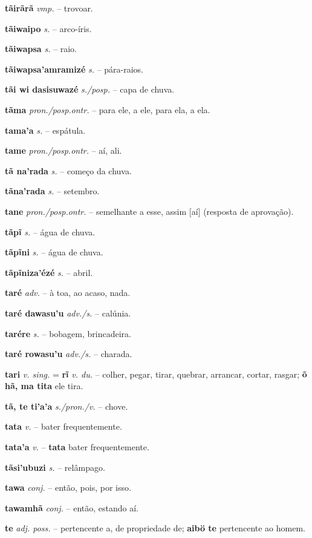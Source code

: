 \textbf{tãirãrã} \textit{vmp.} -- trovoar.

\textbf{tãiwaipo} \textit{s.} -- arco-íris.

\textbf{tãiwapsa} \textit{s.} -- raio.

\textbf{tãiwapsa'amramizé} \textit{s.} -- pára-raios.

\textbf{tãi wi dasisuwazé} \textit{s./posp.} -- capa de chuva.

\textbf{tãma} \textit{pron./posp.ontr.} -- para ele, a ele, para ela, a ela.

\textbf{tama'a} \textit{s.} -- espátula.

\textbf{tame} \textit{pron./posp.ontr.} -- aí, ali.

\textbf{tã na'rada} \textit{s.} -- começo da chuva.

\textbf{tãna'rada} \textit{s.} -- setembro.

\textbf{tane} \textit{pron./posp.ontr.} -- semelhante a esse, assim [aí] (resposta de aprovação).

\textbf{tãpĩ} \textit{s.} -- água de chuva.

\textbf{tãpĩni} \textit{s.} -- água de chuva.

\textbf{tãpĩniza'ézé} \textit{s.} -- abril.

\textbf{taré} \textit{adv.} -- à toa, ao acaso, nada.

\textbf{taré dawasu'u} \textit{adv./s.} -- calúnia.

\textbf{tarére} \textit{s.} -- bobagem, brincadeira.

\textbf{taré rowasu'u} \textit{adv./s.} -- charada.

\textbf{tari} \textit{v. sing.} = \textbf{rĩ} \textit{v. du.} -- colher, pegar, tirar, quebrar, arrancar, cortar, rasgar; \textbf{õ hã, ma tita} ele tira.

\textbf{tã, te ti'a'a} \textit{s./pron./v.} -- chove.

\textbf{tata} \textit{v.} -- bater frequentemente.

\textbf{tata'a} \textit{v.} -- \textbf{tata} bater frequentemente.

\textbf{tãsi'ubuzi} \textit{s.} -- relâmpago.

\textbf{tawa} \textit{conj.} -- então, pois, por isso.

\textbf{tawamhã} \textit{conj.} -- então, estando aí.

\textbf{te} \textit{adj. poss.} -- pertencente a, de propriedade de; \textbf{aibö te} pertencente ao homem.

